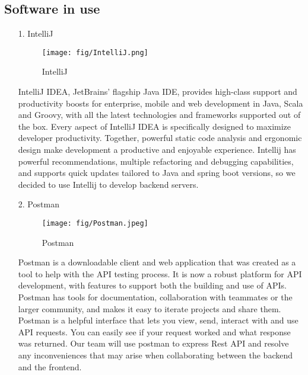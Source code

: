 \documentclass[conference]{IEEEtran}
\begin{document}
\subsection{Software in use}
\begin{enumerate}

    \item[1.]IntelliJ \cite{intellij2011most}
    \begin{figure}[h]
    \centering
    \texttt{[image: fig/IntelliJ.png]}
    \label{fig:IntelliJ}
    \caption{IntelliJ} 
    \end{figure} 
    \item[]IntelliJ IDEA, JetBrains’ flagship Java IDE, provides high-class support and productivity boosts for enterprise, mobile and web development in Java, Scala and Groovy, with all the latest technologies and frameworks supported out of the box. Every aspect of IntelliJ IDEA is specifically designed to maximize developer productivity. Together, powerful static code analysis and ergonomic design make development a productive and enjoyable experience. Intellij has powerful recommendations, multiple refactoring and debugging capabilities, and supports quick updates tailored to Java and spring boot versions, so we decided to use Intellij to develop backend servers.\\
    \clearpage

    \item[2.]Postman \cite{hyams2022you}
    \begin{figure}[h]
    \centering
    \texttt{[image: fig/Postman.jpeg]}
    \label{fig:Postman}
    \caption{Postman} 
    \end{figure}
    \item[]Postman is a downloadable client and web application that was created as a tool to help with the API testing process. It is now a robust platform for API development, with features to support both the building and use of APIs. Postman has tools for documentation, collaboration with teammates or the larger community, and makes it easy to iterate projects and share them. Postman is a helpful interface that lets you view, send, interact with and use API requests. You can easily see if your request worked and what response was returned. Our team will use postman to express Rest API and resolve any inconveniences that may arise when collaborating between the backend and the frontend.\\ 


\end{enumerate}
\end{document}
